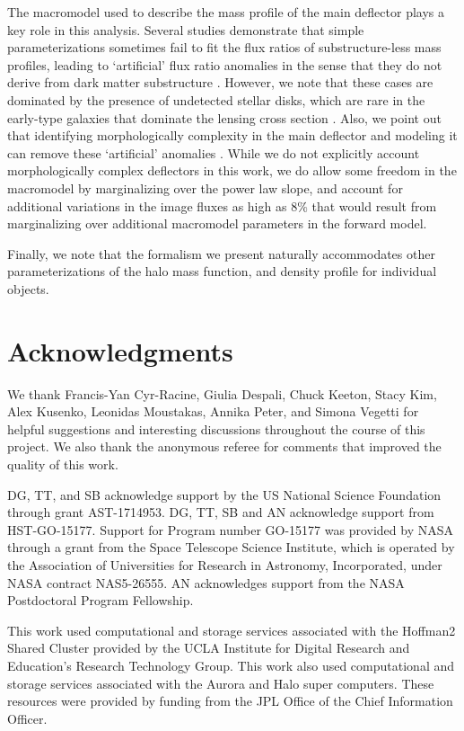 The macromodel used to describe the mass profile of the main deflector plays a key role in this analysis. Several studies demonstrate that simple parameterizations sometimes fail to fit the flux ratios of substructure-less mass profiles, leading to `artificial' flux ratio anomalies in the sense that they do not derive from dark matter substructure \citep{Gilman++17,Hsueh++18}. However, we note that these cases are dominated by the presence of undetected stellar disks, which are rare in the early-type galaxies that dominate the lensing cross section \citep{Auger++10,Shankar++17}. Also, we point out that identifying morphologically complexity in the main deflector and modeling it can remove these `artificial' anomalies \citep{Hsueh++16}. While we do not explicitly account morphologically complex deflectors in this work, we do allow some freedom in the macromodel by marginalizing over the power law slope, and account for additional variations in the image fluxes as high as $8\%$ that would result from marginalizing over additional macromodel parameters in the forward model. 

Finally, we note that the formalism we present naturally accommodates other parameterizations of the halo mass function, and density profile for individual objects. 

\section*{Acknowledgments}
We thank Francis-Yan Cyr-Racine, Giulia Despali, Chuck Keeton, Stacy Kim, Alex Kusenko, Leonidas Moustakas, Annika Peter, and Simona Vegetti for helpful suggestions and interesting discussions throughout the course of this project. We also thank the anonymous referee for comments that improved the quality of this work. 

DG, TT, and SB acknowledge support by the US National Science Foundation through grant AST-1714953. DG, TT, SB and AN acknowledge support from HST-GO-15177. Support for Program number GO-15177 was provided by NASA through a grant from the Space Telescope Science Institute, which is operated by the Association of Universities for Research in Astronomy, Incorporated, under NASA contract NAS5-26555. AN acknowledges support from the NASA Postdoctoral Program Fellowship. 

This work used computational and storage services associated with the Hoffman2 Shared Cluster provided by the UCLA Institute for Digital Research and Education's Research Technology Group. This work also used computational and storage services associated with the Aurora and Halo super computers. These resources were provided by funding from the JPL Office of the Chief Information Officer. 


